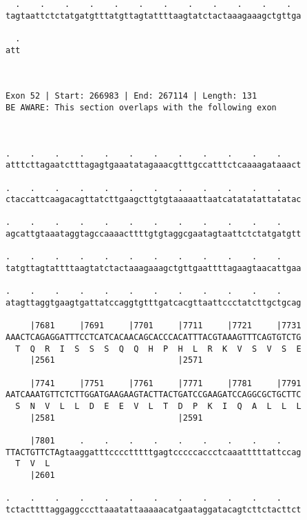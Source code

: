 \documentclass{article}
\begin{document}
\begin{Verbatim}
  .    .    .    .    .    .    .    .    .    .    .    .  
tagtaattctctatgatgtttatgttagtattttaagtatctactaaagaaagctgttga
                                                            
  .
att
   
   
 
Exon 52 | Start: 266983 | End: 267114 | Length: 131
BE AWARE: This section overlaps with the following exon



.    .    .    .    .    .    .    .    .    .    .    .    
atttcttagaatctttagagtgaaatatagaaacgtttgccatttctcaaaagataaact
                                                            
.    .    .    .    .    .    .    .    .    .    .    .    
ctaccattcaagacagttatcttgaagcttgtgtaaaaattaatcatatatattatatac
                                                            
.    .    .    .    .    .    .    .    .    .    .    .    
agcattgtaaataggtagccaaaacttttgtgtaggcgaatagtaattctctatgatgtt
                                                            
.    .    .    .    .    .    .    .    .    .    .    .    
tatgttagtattttaagtatctactaaagaaagctgttgaattttagaagtaacattgaa
                                                            
.    .    .    .    .    .    .    .    .    .    .    .    
atagttaggtgaagtgattatccaggtgtttgatcacgttaattccctatcttgctgcag
                                                            
     |7681     |7691     |7701     |7711     |7721     |7731
AAACTCAGAGGATTTCCTCATCACAACAGCACCCACATTTACGTAAAGTTTCAGTGTCTG
  T  Q  R  I  S  S  S  Q  Q  H  P  H  L  R  K  V  S  V  S  E
     |2561                         |2571                    
  
     |7741     |7751     |7761     |7771     |7781     |7791
AATCAAATGTTCTCTTGGATGAAGAAGTACTTACTGATCCGAAGATCCAGGCGCTGCTTC
  S  N  V  L  L  D  E  E  V  L  T  D  P  K  I  Q  A  L  L  L
     |2581                         |2591                    
  
     |7801     .    .    .    .    .    .    .    .    .    
TTACTGTTCTAgtaaggatttcccctttttgagtcccccaccctcaaatttttattccag
  T  V  L                                                   
     |2601                                                  
  
.    .    .    .    .    .    .    .    .    .    .    .    
tctacttttaggaggcccttaaatattaaaaacatgaataggatacagtcttctacttct
                                                            

\end{Verbatim}
\end{document}
